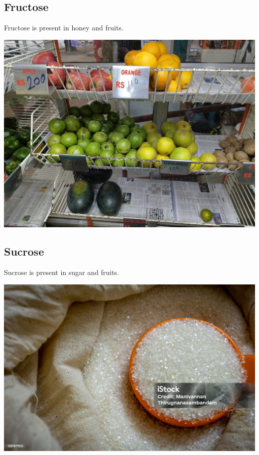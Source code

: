 \documentclass[
]{book}
\begin{document}
\subsection*{Fructose}\label{fructose}

Fructose is present in honey and fruits.

\includegraphics{Images/Fruit.jpg}

\subsection*{Sucrose}\label{sucrose}

Sucrose is present in sugar and fruits.

\includegraphics{Images/Sugar.jpg}
\end{document}
